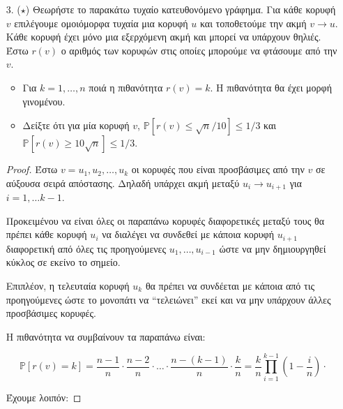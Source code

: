 \documentclass[a4paper, oneside, 11pt]{article}
\theoremstyle{definition}
\newcommand{\pr}{\mathbb{P}}
\begin{document}
\begin{enumerate}
\item[3. ($\star$)]
   Θεωρήστε το παρακάτω τυχαίο κατευθονόμενο γράφημα. Για κάθε κορυφή $v$
   επιλέγουμε ομοιόμορφα τυχαία μια κορυφή $u$ και τοποθετούμε την ακμή
   $v \rightarrow u$. Κάθε κορυφή έχει μόνο μια εξερχόμενη ακμή και μπορεί να
   υπάρχουν θηλιές. Έστω $r(v)$ ο αριθμός των κορυφών στις οποίες μπορούμε να
   φτάσουμε από την $v$.

   \begin{itemize}
      \item Για $k = 1, \ldots, n$ ποιά η πιθανότητα $r(v) = k$. Η πιθανότητα θα
            έχει μορφή γινομένου.
      \item Δείξτε ότι για μία κορυφή $v$, $\pr [ r(v) \leq \sqrt{n} / 10 ]
            \leq 1/3$ και $\pr [ r(v) \geq 10\sqrt{n} ] \leq 1/3$.
   \end{itemize}

   \begin{proof}
      Έστω $v = u_1, u_2, \ldots, u_k$ οι κορυφές που είναι προσβάσιμες από την
      $v$ σε αύξουσα σειρά απόστασης. Δηλαδή υπάρχει ακμή μεταξύ $u_i
      \rightarrow u_{i+1}$ για $i = 1, \ldots k-1$.

      Προκειμένου να είναι όλες οι παραπάνω κορυφές διαφορετικές μεταξύ τους θα
      πρέπει κάθε κορυφή $u_i$ να διαλέγει να συνδεθεί με κάποια κορυφή
      $u_{i+1}$ διαφορετική από όλες τις προηγούμενες $u_1, \ldots, u_{i-1}$
      ώστε να μην δημιουργηθεί κύκλος σε εκείνο το σημείο.

      Επιπλέον, η τελευταία κορυφή $u_k$ θα πρέπει να συνδέεται με κάποια από
      τις προηγούμενες ώστε το μονοπάτι να ``τελειώνει'' εκεί και να μην
      υπάρχουν άλλες προσβάσιμες κορυφές.

      Η πιθανότητα να συμβαίνουν τα παραπάνω είναι:

      \[ \pr[r(v) = k] = \frac{n-1}{n} \cdot \frac{n-2}{n} \cdot \ldots \cdot
         \frac{n-(k-1)}{n} \cdot \frac{k}{n} = \frac{k}{n} \prod_{i=1}^{k-1}
         \left(1 - \frac{i}{n} \right) \cdot \]

      Έχουμε λοιπόν:


\end{proof}
\end{enumerate}
\end{document}
